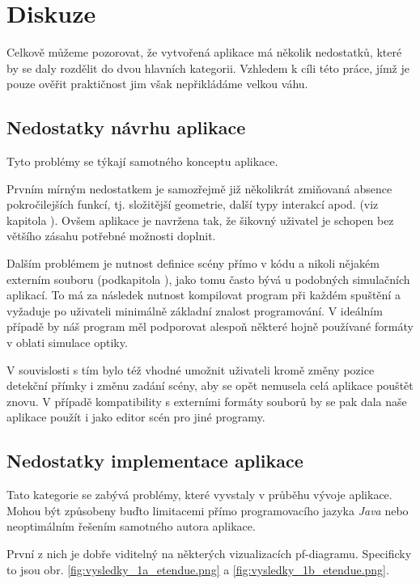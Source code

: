 \chapter{Diskuze}

Celkově můžeme pozorovat, že vytvořená aplikace má několik nedostatků, které by se daly rozdělit do dvou hlavních kategorii. Vzhledem k cíli této práce, jímž je pouze ověřit praktičnost jim však nepřikládáme velkou váhu.

\section{Nedostatky návrhu aplikace}

Tyto problémy se týkají samotného konceptu aplikace.

Prvním mírným nedostatkem je samozřejmě již několikrát zmiňovaná absence pokročilejších funkcí, tj. složitější geometrie, další typy interakcí apod. (viz kapitola ). Ovšem aplikace je navržena tak, že šikovný uživatel je schopen bez většího zásahu potřebné možnosti doplnit.

Dalším problémem je nutnost definice scény přímo v kódu a nikoli nějakém externím souboru (podkapitola ), jako tomu často bývá u podobných simulačních aplikací. To má za následek nutnost kompilovat program při každém spuštění a vyžaduje po uživateli minimálně základní znalost programování. V ideálním případě by náš program měl podporovat alespoň některé hojně používané formáty v oblati simulace optiky.\src

V souvislosti s tím bylo též vhodné umožnit uživateli kromě změny pozice detekční přímky i změnu zadání scény, aby se opět nemusela celá aplikace pouštět znovu. V případě kompatibility s externími formáty souborů by se pak dala naše aplikace použít i jako editor scén pro jiné programy.

\section{Nedostatky implementace aplikace}

Tato kategorie se zabývá problémy, které vyvstaly v průběhu vývoje aplikace. Mohou být způsobeny buďto limitacemi přímo programovacího jazyka \emph{Java} nebo neoptimálním řešením samotného autora aplikace.

První z nich je dobře viditelný na některých vizualizacích pf-diagramu. Specificky to jsou obr. \ref{fig:vysledky_1a_etendue.png} a \ref{fig:vysledky_1b_etendue.png}.





